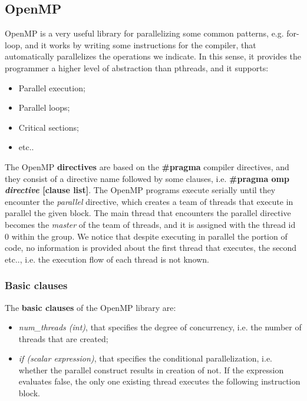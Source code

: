\subsection{OpenMP}
OpenMP is a very useful library for parallelizing some common patterns, e.g. for-loop, and it works by writing some instructions for the compiler, that automatically parallelizes the operations we indicate. In this sense, it provides the programmer a higher level of abstraction than pthreads, and it supports:

\begin{itemize}
    \item Parallel execution;
    \item Parallel loops;
    \item Critical sections;
    \item etc..
\end{itemize}

The OpenMP \textbf{directives} are based on the \textbf{\#pragma} compiler directives, and they consist of a directive name followed by some clauses, i.e. \textbf{\#pragma omp \textit{directive} [clause list]}. The OpenMP programs execute serially until they encounter the \textit{parallel} directive, which creates a team of threads that execute in parallel the given block. The main thread that encounters the parallel directive becomes the \textit{master} of the team of threads, and it is assigned with the thread id 0 within the group. We notice that despite executing in parallel the portion of code, no information is provided about the first thread that executes, the second etc.., i.e. the execution flow of each thread is not known.

\subsubsection{Basic clauses}
The \textbf{basic clauses} of the OpenMP library are:

\begin{itemize}
    \item \textit{num\_threads (int)}, that specifies the degree of concurrency, i.e. the number of threads that are created;
    \item \textit{if (scalar expression)}, that specifies the conditional parallelization, i.e. whether the parallel construct results in creation of not. If the expression evaluates false, the only one existing thread executes the following instruction block.
\end{itemize}

